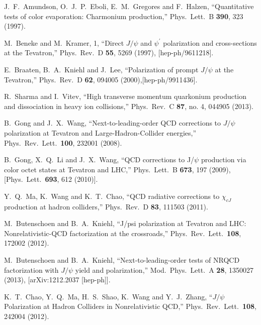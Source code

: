 \documentclass[12pt,a4paper,final]{iopart}
\begin{document}
\begin{thebibliography}{100}
  J.~F.~Amundson, O.~J.~P.~Eboli, E.~M.~Gregores and F.~Halzen,
  ``Quantitative tests of color evaporation: Charmonium production,''
  Phys.\ Lett.\ B {\bf 390}, 323 (1997).


  M.~Beneke and M.~Kramer, 1,
  ``Direct $J/\psi$ and $\psi^\prime$ polarization and cross-sections at the Tevatron,''
  Phys.\ Rev.\ D {\bf 55}, 5269 (1997), [hep-ph/9611218].


  E.~Braaten, B.~A.~Kniehl and J.~Lee,
  ``Polarization of prompt $J/\psi$ at the Tevatron,''
  Phys.\ Rev.\ D {\bf 62}, 094005 (2000),[hep-ph/9911436].


  R.~Sharma and I.~Vitev,
  ``High transverse momentum quarkonium production and dissociation in heavy ion collisions,''
  Phys.\ Rev.\ C {\bf 87}, no. 4, 044905 (2013).


  B.~Gong and J.~X.~Wang,
  ``Next-to-leading-order QCD corrections to $J/\psi$ polarization at Tevatron and Large-Hadron-Collider energies,''
  Phys.\ Rev.\ Lett.\  {\bf 100}, 232001 (2008).
  

  B.~Gong, X.~Q.~Li and J.~X.~Wang,
  ``QCD corrections to J/$\psi$ production via color octet states at Tevatron and LHC,''
  Phys.\ Lett.\ B {\bf 673}, 197 (2009),
  [Phys.\ Lett.\  {\bf 693}, 612 (2010)].
  
  Y.~Q.~Ma, K.~Wang and K.~T.~Chao,
  ``QCD radiative corrections to $\chi_{cJ}$ production at hadron colliders,''
  Phys.\ Rev.\ D {\bf 83}, 111503 (2011).


  M.~Butenschoen and B.~A.~Kniehl,
  ``J/psi polarization at Tevatron and LHC: Nonrelativistic-QCD factorization at the crossroads,''
  Phys.\ Rev.\ Lett.\  {\bf 108}, 172002 (2012).
  
  M.~Butenschoen and B.~A.~Kniehl,
  ``Next-to-leading-order tests of NRQCD factorization with $J/\psi$ yield and polarization,''
  Mod.\ Phys.\ Lett.\ A {\bf 28}, 1350027 (2013), [arXiv:1212.2037 [hep-ph]].






  K.~T.~Chao, Y.~Q.~Ma, H.~S.~Shao, K.~Wang and Y.~J.~Zhang,
  ``$J/\psi$ Polarization at Hadron Colliders in Nonrelativistic QCD,''
  Phys.\ Rev.\ Lett.\  {\bf 108}, 242004 (2012).
  

\end{thebibliography}
\end{document}
